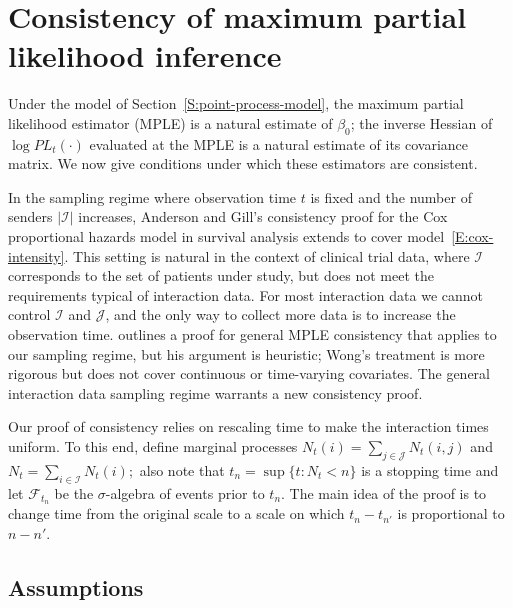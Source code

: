 \documentclass[final]{statsoc}
\begin{document}
\section{Consistency of maximum partial likelihood inference}
\label{S:MPLE-consistency}

Under the model of Section~\ref{S:point-process-model}, the maximum partial likelihood estimator (MPLE) is a natural
estimate of $\beta_0$; the inverse Hessian of $\log \mathit{PL}_t(\cdot)$
evaluated at the MPLE is a natural estimate of its covariance matrix.
We now give conditions under which these
estimators are consistent.

In the sampling regime where observation time $t$ is fixed and the number of
senders $|\mathcal{I}|$ increases, Anderson and Gill's \citeyearpar{andersen1982cox} consistency proof for
the Cox proportional hazards model in survival analysis extends
to cover model~\eqref{E:cox-intensity}.  This setting is natural in the
context of clinical trial data, where $\mathcal{I}$ corresponds to the set of
patients under study, but does not meet the requirements typical of
interaction data.  For most interaction
data we cannot control $\mathcal{I}$ and $\mathcal{J}$, and the only way to
collect more data is to increase the observation time.  \citet{cox1972regression,cox1975partial} outlines a proof for general
MPLE consistency that applies to our sampling regime, but his argument is
heuristic; Wong's \citeyearpar{wong1986theory} treatment is more rigorous but does not cover continuous or
time-varying covariates. The general
interaction data sampling regime warrants a new consistency proof.

Our proof of consistency relies on rescaling time to make the interaction
times uniform.  To this end, define marginal processes
\(
    N_t(i) = \sum_{j \in \mathcal{J}} N_t(i,j)
\)
and
\(
    N_t = \sum_{i \in \mathcal{I}} N_t(i);
\)
also note that $t_n = \sup\{ t : N_t < n \}$ is a stopping time
and let $\mathcal{F}_{t_n}$ be the $\sigma$-algebra of events prior to
$t_n$. The main idea of the proof is to change time from the original scale
to a scale on which $t_{n} - t_{n'}$ is proportional to $n - n'$.

\subsection{Assumptions}
\end{document}
